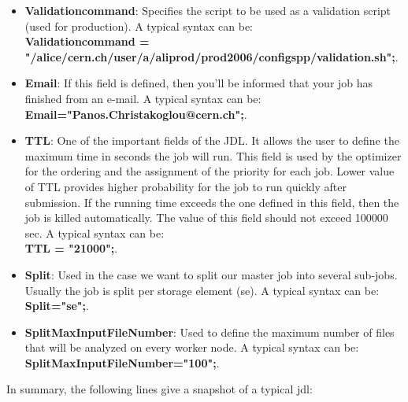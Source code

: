 \begin{itemize}
\item \textbf{Validationcommand}: Specifies the script to be used as a validation script (used for production). A typical syntax can be: \\{\ttfamily \textbf{Validationcommand =\\"/alice/cern.ch/user/a/aliprod/prod2006/configspp/validation.sh";}}.

\item \textbf{Email}: If this field is defined, then you'll be informed that your job has finished from an e-mail. A typical syntax can be: \\{\ttfamily \textbf{Email="Panos.Christakoglou@cern.ch";}}.

\item \textbf{TTL}: One of the important fields of the JDL. It allows the user to define the maximum time in seconds the job will run. This field is used by the optimizer for the ordering and the assignment of the priority for each job. Lower value of TTL provides higher probability for the job to run quickly after submission. If the running time exceeds the one defined in this field, then the job is killed automatically. The value of this field should not exceed 100000 sec. A typical syntax can be: \\{\ttfamily \textbf{TTL = "21000";}}. 

\item \textbf{Split}: Used in the case we want to split our master job into several sub-jobs. Usually the job is split per storage element (se). A typical syntax can be: \\{\ttfamily \textbf{Split="se";}}.

\item \textbf{SplitMaxInputFileNumber}: Used to define the maximum number of files that will be analyzed on every worker node. A typical syntax can be: \\{\ttfamily \textbf{SplitMaxInputFileNumber="100";}}.

\end{itemize}

In summary, the following lines give a snapshot of a typical jdl:

